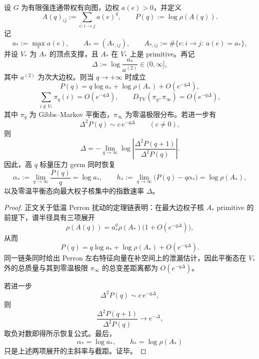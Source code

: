 \begin{theorem}\label{thm:conclusion-lowtemp-pressure-germ-dual-recovery}
设 \(G\) 为有限强连通带权有向图，边权 \(a(e)>0\)，并定义
\[
A(q)_{ij}:=\sum_{e:i\to j}a(e)^q,
\qquad
P(q):=\log\rho(A(q)).
\]
记
\[
a_*:=\max_e a(e),
\qquad
A_*=(A_{*,ij}),\qquad
A_{*,ij}:=\#\{e:i\to j:\ a(e)=a_*\},
\]
并设 \(V_*\) 为 \(A_*\) 的顶点支撑，且 \(A_*\) 在 \(V_*\) 上是 primitive。再记
\[
\Delta:=\log\frac{a_*}{a^{(2)}}\in(0,\infty],
\]
其中 \(a^{(2)}\) 为次大边权。则当 \(q\to+\infty\) 时成立
\[
P(q)=q\log a_*+\log\rho(A_*)+O(e^{-q\Delta}),
\]
\[
\sum_{i\notin V_*}\pi_q(i)=O(e^{-q\Delta}),
\qquad
D_{\mathrm{TV}}(\pi_q,\pi_\infty)=O(e^{-q\Delta}),
\]
其中 \(\pi_q\) 为 Gibbs--Markov 平衡态，\(\pi_\infty\) 为零温极限分布。若进一步有
\[
\Delta^2P(q)\sim c\,e^{-q\Delta}
\qquad (c\neq 0),
\]
则
\[
\Delta=
-\lim_{q\to\infty}\log\left|
\frac{\Delta^2P(q+1)}{\Delta^2P(q)}
\right|.
\]
因此，高 \(q\) 标量压力 germ 同时恢复
\[
\alpha_*:=\lim_{q\to\infty}\frac{P(q)}{q}=\log a_*,
\qquad
h_*:=\lim_{q\to\infty}\bigl(P(q)-q\alpha_*\bigr)=\log\rho(A_*),
\]
以及零温平衡态向最大权子核集中的指数速率 \(\Delta\)。
\end{theorem}
\begin{proof}
正文关于低温 Perron 扰动的定理链表明：在最大边权子核 \(A_*\) primitive 的前提下，谱半径具有三项展开
\[
\rho(A(q))
=
a_*^q\rho(A_*)\bigl(1+O(e^{-q\Delta})\bigr),
\]
从而
\[
P(q)=q\log a_*+\log\rho(A_*)+O(e^{-q\Delta}).
\]
同一链条同时给出 Perron 左右特征向量在补空间上的泄漏估计，因此平衡态在 \(V_*\) 外的总质量与其到零温极限 \(\pi_\infty\) 的总变差距离都为 \(O(e^{-q\Delta})\)。

若进一步
\[
\Delta^2P(q)\sim c\,e^{-q\Delta},
\]
则
\[
\frac{\Delta^2P(q+1)}{\Delta^2P(q)}\to e^{-\Delta},
\]
取负对数即得所示恢复公式。最后，
\[
\alpha_*=\log a_*,
\qquad
h_*=\log\rho(A_*)
\]
只是上述两项展开的主斜率与截距。证毕。
\end{proof}


